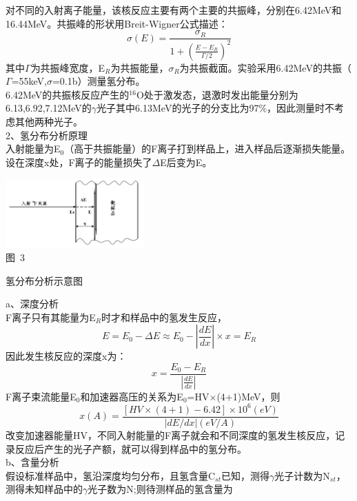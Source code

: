 \documentclass[a4paper,10.0pt,twoside]{npr}
\begin{document}
\begin{multicols}{2}
对不同的入射离子能量，该核反应主要有两个主要的共振峰，分别在6.42MeV和16.44MeV。共振峰的形状用Breit-Wigner公式描述：
\begin{equation}
\sigma (E)=\frac{\sigma _R}{1+(\frac{E-E_R}{\Gamma /2})^2}
\end{equation}
其中$\Gamma$为共振峰宽度，E$_R$为共振能量，$\sigma$$_R$为共振截面。实验采用6.42MeV的共振（$\Gamma$=55keV,$\sigma$=0.1b）测量氢分布。\\
6.42MeV的共振核反应产生的$^{16}$O处于激发态，退激时发出能量分别为6.13,6.92,7.12MeV的$\gamma$光子其中6.13MeV的光子的分支比为97\%，因此测量时不考虑其他两种光子。\\
2、氢分布分析原理\\
入射能量为E$_0$（高于共振能量）的F离子打到样品上，进入样品后逐渐损失能量。设在深度x处，F离子的能量损失了$\Delta$E后变为E。
\begin{center}
\includegraphics[width=0.4\textwidth]{3.png}
\\
\xiaowu\song 图~3\begin{minipage}[t]{75mm} \quad 氢分布分析示意图\\[-1mm]\wuhao
\end{minipage}
\end{center}
a、深度分析\\
F离子只有其能量为E$_R$时才和样品中的氢发生反应，
\begin{equation}
E=E_0-\Delta E \approx E_0-\left| \frac{dE}{dx} \right| \times x=E_R
\end{equation}
因此发生核反应的深度x为：
\begin{equation}
x=\frac{E_0-E_R}{\left| \frac{dE}{dx} \right| }
\end{equation}
F离子束流能量E$_0$和加速器高压的关系为E$_0$=HV$\times$(4+1)MeV，则
\begin{equation}
x(A)=\frac{[HV\times (4+1)-6.42]\times 10^6 (eV)}{\left| dE/dx \right| (eV/A)}
\end{equation}
改变加速器能量HV，不同入射能量的F离子就会和不同深度的氢发生核反应，记录反应后产生的光子产额，就可以得到样品中的氢分布。\\
b、含量分析\\
假设标准样品中，氢沿深度均匀分布，且氢含量C$_{st}$已知，测得$\gamma$光子计数为N$_{st}$，测得未知样品中的$\gamma$光子数为N;则待测样品的氢含量为
$$
\end{multicols}
\end{document}
